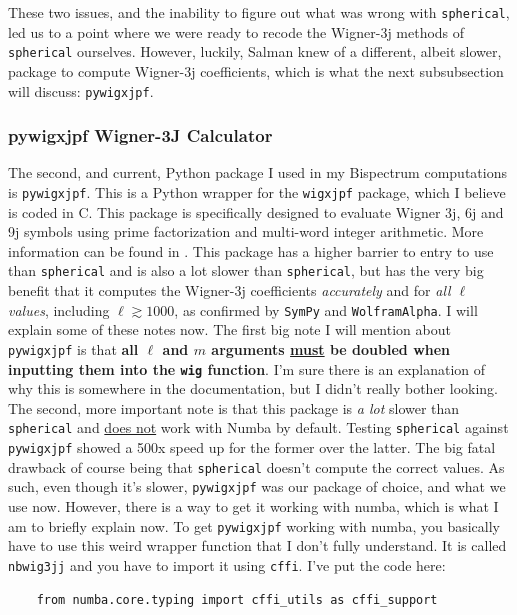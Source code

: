 \documentclass[11pt]{article}
\renewcommand{\_}[1]{\underline{ #1 }}
\newcommand{\npar}{\vspace{.3cm}\newline}
\begin{document}
{These two issues, and the inability to figure out what was wrong with \texttt{spherical}, led us to a point where we were ready to recode the Wigner-3j methods of \texttt{spherical} ourselves. However, luckily, Salman knew of a different, albeit slower, package to compute Wigner-3j coefficients, which is what the next subsubsection will discuss: \texttt{pywigxjpf}.

\subsubsection{pywigxjpf Wigner-3J Calculator}\label{pywigxjpf}

The second, and current, Python package I used in my Bispectrum computations is \texttt{pywigxjpf}. This is a Python wrapper for the \texttt{wigxjpf} package, which I believe is coded in C. This package is specifically designed to evaluate Wigner 3j, 6j and 9j symbols using prime factorization and multi-word integer arithmetic. More information can be found in \cite{Johansson_2016}. This package has a higher barrier to entry to use than \texttt{spherical} and is also a lot slower than \texttt{spherical}, but has the very big benefit that it computes the Wigner-3j coefficients \textit{accurately} and for \textit{all $\ell$ values}, including $\ell \gtrsim  1000$, as confirmed by \texttt{SymPy} and \texttt{WolframAlpha}. I will explain some of these notes now.
\npar
The first big note I will mention about \texttt{pywigxjpf} is that \textbf{all $\ell$ and $m$ arguments \underline{must} be doubled when inputting them into the \texttt{wig} function}. I'm sure there is an explanation of why this is somewhere in the documentation, but I didn't really bother looking.
\npar
The second, more important note is that this package is \textit{a lot} slower than \texttt{spherical} and \underline{does not} work with Numba by default. Testing \texttt{spherical} against \texttt{pywigxjpf} showed a 500x speed up for the former over the latter. The big fatal drawback of course being that \texttt{spherical} doesn't compute the correct values. As such, even though it's slower, \texttt{pywigxjpf} was our package of choice, and what we use now. However, there is a way to get it working with numba, which is what I am to briefly explain now.
\npar
To get \texttt{pywigxjpf} working with numba, you basically have to use this weird wrapper function that I don't fully understand. It is called \texttt{nb\textunderscore wig3jj} and you have to import it using \texttt{cffi}. I've put the code here:
\begin{verbatim}
    from numba.core.typing import cffi_utils as cffi_support


\end{verbatim}}
\end{document}
